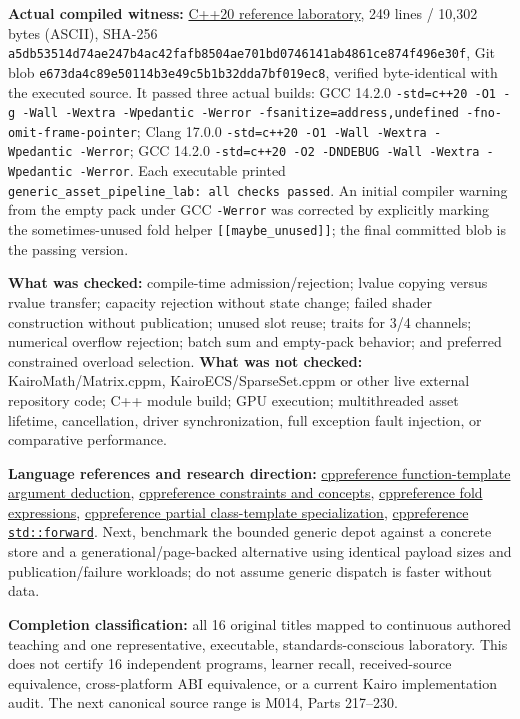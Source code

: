 \textbf{Actual compiled witness:} \hyperref[source-file-a5db53514d74ae247b4ac42f]{C++20 reference laboratory}, 249 lines / 10,302 bytes (ASCII), SHA-256 \texttt{a5db53514d74ae247b4ac42fafb8504ae701bd0746141ab4861ce874f496e30f}, Git blob \texttt{e673da4c89e50114b3e49c5b1b32dda7bf019ec8}, verified byte-identical with the executed source. It passed three actual builds: GCC 14.2.0 \texttt{-std=c++20\ -O1\ -g\ -Wall\ -Wextra\ -Wpedantic\ -Werror\ -fsanitize=address,undefined\ -fno-omit-frame-pointer}; Clang 17.0.0 \texttt{-std=c++20\ -O1\ -Wall\ -Wextra\ -Wpedantic\ -Werror}; GCC 14.2.0 \texttt{-std=c++20\ -O2\ -DNDEBUG\ -Wall\ -Wextra\ -Wpedantic\ -Werror}. Each executable printed \texttt{generic\_asset\_pipeline\_lab:\ all\ checks\ passed}. An initial compiler warning from the empty pack under GCC \texttt{-Werror} was corrected by explicitly marking the sometimes-unused fold helper \texttt{{[}{[}maybe\_unused{]}{]}}; the final committed blob is the passing version.

\textbf{What was checked:} compile-time admission/rejection; lvalue copying versus rvalue transfer; capacity rejection without state change; failed shader construction without publication; unused slot reuse; traits for 3/4 channels; numerical overflow rejection; batch sum and empty-pack behavior; and preferred constrained overload selection. \textbf{What was not checked:} KairoMath/Matrix.cppm, KairoECS/SparseSet.cppm or other live external repository code; C++ module build; GPU execution; multithreaded asset lifetime, cancellation, driver synchronization, full exception fault injection, or comparative performance.

\textbf{Language references and research direction:} \href{https://en.cppreference.com/w/cpp/language/template_argument_deduction}{cppreference function-template argument deduction}, \href{https://en.cppreference.com/w/cpp/language/constraints}{cppreference constraints and concepts}, \href{https://en.cppreference.com/w/cpp/language/fold}{cppreference fold expressions}, \href{https://en.cppreference.com/w/cpp/language/partial_specialization}{cppreference partial class-template specialization}, \href{https://en.cppreference.com/w/cpp/utility/forward}{cppreference \texttt{std::forward}}. Next, benchmark the bounded generic depot against a concrete store and a generational/page-backed alternative using identical payload sizes and publication/failure workloads; do not assume generic dispatch is faster without data.

\textbf{Completion classification:} all 16 original titles mapped to continuous authored teaching and one representative, executable, standards-conscious laboratory. This does not certify 16 independent programs, learner recall, received-source equivalence, cross-platform ABI equivalence, or a current Kairo implementation audit. The next canonical source range is M014, Parts 217--230.

